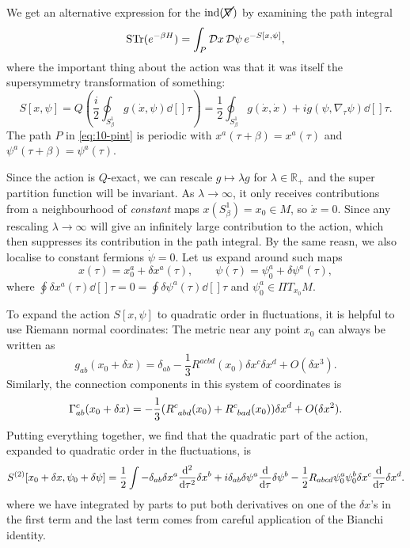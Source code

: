 We get an alternative expression for the $\text{ind}(\cancel{\nabla})$ by examining the path integral
\begin{equation}
  \text{STr} (e^{-\beta H}) = \int_P \mathop{\mathcal{D} x} \mathop{\mathcal{D} \psi} e^{-S[x, \psi]},
\end{equation}
where the important thing about the action was that it was itself the supersymmetry transformation of something:
\begin{equation}
  S[x, \psi] = Q \left( \frac{i}{2} \oint_{S^1_\beta} g (\dot{x}, \psi) \dd[]{\tau} \right) = \frac{1}{2} \oint_{S^1_\beta} g(\dot{x}, \dot{x}) + i g (\psi, \nabla_\tau \psi) \dd[]{\tau}.
\end{equation}
The path $P$ in \eqref{eq:10-pint} is periodic with $x^{a}(\tau + \beta) = x^{a}(\tau)$ and $\psi^{a}(\tau + \beta) = \psi^{a}(\tau)$.

Since the action is $Q$-exact, we can rescale $g \mapsto \lambda g$ for $\lambda \in \mathbb{R}_+$ and the super partition function will be invariant. As $\lambda \to \infty$, it only receives contributions from a neighbourhood of \emph{constant} maps $x(S^1_\beta) = x_0 \in M$, so $\dot{x} =0$.
Since any rescaling $\lambda \to \infty$ will give an infinitely large contribution to the action, which then suppresses its contribution in the path integral.
By the same reasn, we also localise to constant fermions $\dot{\psi} = 0$.
Let us expand around such maps
\begin{equation}
  x(\tau) = x_0^a + \delta x^a(\tau), \qquad \psi(\tau) = \psi^a_0 + \delta \psi^a(\tau),
\end{equation}
where $\oint \delta x^{a} (\tau) \dd[]{\tau} = 0 = \oint \delta\psi^a (\tau) \dd[]{\tau}$ and $\psi_0^a \in \Pi T_{x_0} M$.

To expand the action $S[x, \psi]$ to quadratic order in fluctuations, it is helpful to use Riemann normal coordinates: The metric near any point $x_0$ can always be written as 
\begin{equation}
  g_{ab}(x_0 + \delta x) = \delta_{ab} - \frac{1}{3} R^{acbd} (x_0) \delta x^{c} \delta x^{d} + O (\delta x^3).
\end{equation}
Similarly, the connection components in this system of coordinates is
\begin{equation}
\Gamma^{c}_{ab} (x_0 + \delta x) = -\frac{1}{3} (R\indices{^{c}_{abd}}(x_0) + R\indices{^{c}_{bad}}(x_0)) \delta x^{d} + O(\delta x^2).
\end{equation}
Putting everything together, we find that the quadratic part of the action, expanded to quadratic order in the fluctuations, is
\begin{equation}
  S^{(2)} [x_0 + \delta x, \psi_0 + \delta \psi] = \frac{1}{2} \int -\delta_{ab} \delta x^{a} \dv[2]{\tau} \delta x^{b} + i \delta_{ab} \delta \psi^{a} \dv{\tau} \delta \psi^{b} - \frac{1}{2} R_{abcd} \psi^{a}_0 \psi_0^b \delta x^{c} \dv{\tau} \delta x^{d}.
\end{equation}
where we have integrated by parts to put both derivatives on one of the $\delta x$'s in the first term and the last term comes from careful application of the Bianchi identity.

